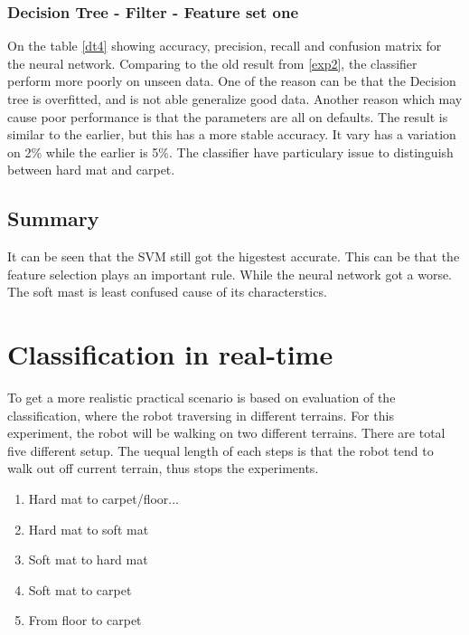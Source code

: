\documentclass[USenglish]{ifimaster}  %
\begin{document}
\subsubsection{Decision Tree - Filter - Feature set one}
On the table \ref{dt4} showing accuracy, precision, recall and confusion matrix for the neural network. Comparing to the old result from \ref{exp2}, the classifier perform more poorly on unseen data. One of the reason can be that the Decision tree is overfitted, and is not able generalize good data. Another reason which may cause poor performance is that the parameters are all on defaults. The result is similar to the earlier, but this has a more stable accuracy. It vary has a variation on 2\% while the earlier is 5\%. The classifier have particulary issue to distinguish between hard mat and carpet. 


\subsection{Summary}
It can be seen that the SVM still got the higestest accurate. This can be that the feature selection plays an important rule. While the neural network got a worse. The soft mast is least confused cause of its characterstics. 


\section{Classification in real-time}
To get a more realistic practical scenario  is based on evaluation of the classification, where the robot traversing in different terrains. For this experiment, the robot will be walking on two different terrains. There are total five different setup. The uequal length of each steps is that the robot tend to walk out off current terrain, thus stops the experiments. 

\begin{enumerate}
\item Hard mat to carpet/floor...
\item Hard mat to soft mat
\item Soft mat to hard mat
\item Soft mat to carpet
\item From floor to carpet
\end{enumerate}
\end{document}
